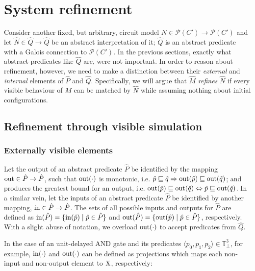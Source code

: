\section{System refinement}

Consider another fixed, but arbitrary, circuit model $N \in \mathcal{P}(C') \rightarrow \mathcal{P}(C')$ and let $\hat N \in \hat Q \rightarrow \hat Q$ be an abstract interpretation of it; $\hat Q$ is an abstract predicate with a Galois connection to $\mathcal{P}(C')$. In the previous sections, exactly what abstract predicates like $\hat Q$ are, were not important. In order to reason about refinement, however, we need to make a distinction between their \textit{external} and \textit{internal} elements of $\hat P$ and $\hat Q$. Specifically, we will argue that $\hat M$ \textit{refines} $\hat N$ if every visible behaviour of $\hat M$ can be matched by $\hat N$ while assuming nothing about initial configurations.

\subsection{Refinement through visible simulation}

\subsubsection{Externally visible elements} Let the output of an abstract predicate $\hat P$ be identified by the mapping $\operatorname{out} \in \hat P \rightarrow \hat P$, such that $\operatorname{out}(\cdot)$ is monotonic, i.e. $\hat p \sqsubseteq \hat q \Rightarrow \operatorname{out}(\hat p) \sqsubseteq \operatorname{out}(\hat q)$; and produces the greatest bound for an output, i.e. $\operatorname{out}(\hat p) \sqsubseteq \operatorname{out}(\hat q) \Leftrightarrow \hat p \sqsubseteq \operatorname{out}(\hat q)$. In a similar vein, let the inputs of an abstract predicate $\hat P$ be identified by another mapping, $\operatorname{in} \in \hat P \rightarrow \hat P$. The sets of all possible inputs and outputs for $\hat P$ are defined as $\operatorname{in}(\hat P) = \{ \operatorname{in}(\hat p) \mid \hat p \in \hat P \}$ and $\operatorname{out}(\hat P) = \{ \operatorname{out}(\hat p) \mid \hat p \in \hat P \}$, respectively. With a slight abuse of notation, we overload $\operatorname{out}(\cdot)$ to accept predicates from $\hat Q$.

In the case of an unit-delayed AND gate and its predicates $\langle p_{0}, p_{1}, p_{2} \rangle \in \mathbb{T}_{\bot}^{3}$, for example, $\operatorname{in}(\cdot)$ and $\operatorname{out}(\cdot)$ can be defined as projections which maps each non-input and non-output element to $\mathrm{X}$, respectively:

